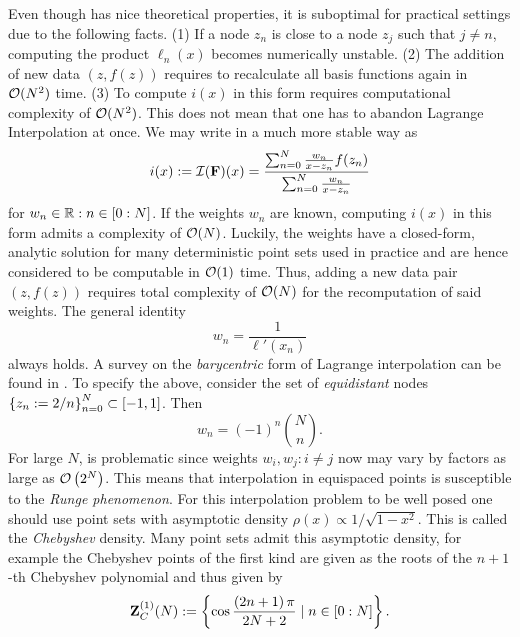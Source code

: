 \documentclass[12pt, oneside]{amsart}
\theoremstyle{definition}
\theoremstyle{remark}
\numberwithin{equation}{section}
\begin{document}
Even though  has nice theoretical properties, 
it is suboptimal for practical settings due to the following facts. (1) If a 
node \(z_n\) is close to a node \(z_j\) such that \(j \neq n\), computing the 
product \(\ell_n(x)\) becomes numerically unstable. (2) The addition of new 
data \(\left(z, f(z)\right)\) requires to recalculate all basis functions again 
in \(\cO(N^2)\) time. (3) To compute \(i(x)\) in this form requires 
computational complexity of \(\cO(N^2)\). This does not mean that one has to 
abandon Lagrange Interpolation at once. We may write 
 in a much more stable way as
\begin{equation}\label{eq:barycentricLagrange}
    i(x) \defn \cI(\FF)(x) = \frac{\sum_{n=0}^N \frac{w_n}{x-z_n} f(z_n)}{\sum_{n=0}^N \frac{w_n}{x-z_n}}
\end{equation}
for \(w_n \in \R : n \in \indexset[0]{N}\). If the weights \(w_n\) are known, 
computing 
\(i(x)\) in this form admits a complexity of \(\cO(N)\). Luckily, the weights 
have a closed-form, analytic solution for many deterministic point sets used in 
practice and are hence considered to be computable in \(\cO(1)\) time. Thus, 
adding a new data pair \((z, f(z))\) requires total complexity of \(\cO(N)\) 
for the recomputation of said weights. The general identity
 \[
    w_n = \frac{1}{\ell'(x_n)}
\]
always holds. A survey on the \emph{barycentric} form of Lagrange interpolation can be found in \cite{Berut_2004}. To specify the above, consider the set of \emph{equidistant} 
nodes \(\set{z_n \defn 2/n}_{n=0}^{N} \subset [-1, 1]\). Then 
\begin{equation}\label{eq:weightsEquidistant}
    w_n = {\left(-1\right)}^n \binom{N}{n}.
\end{equation}
For large \(N\),  is problematic since weights 
\(w_i, w_j: i \neq j\) now may vary by factors as large as 
\(\cO\left(2^N\right)\). This means that interpolation in equispaced points is 
susceptible to the \emph{Runge phenomenon}. For this interpolation problem to 
be well posed one should use point sets with asymptotic density \(\rho(x) 
\propto 1/\sqrt{1-x^2}\). This is called the \emph{Chebyshev} density.\newline 
Many point sets admit this asymptotic density, for 
example the Chebyshev points of the first kind are given as the roots of the 
$n+1$-th Chebyshev polynomial and thus given by
\begin{equation}\label{eq:chebyPts1}
    \ZZ_C^{(1)}(N) \defn 
    \set{\cos \frac{\left(2n+1\right) \pi}{2N+2} \mid n \in 
    \indexset[0]{N}}.
\end{equation}
\end{document}
